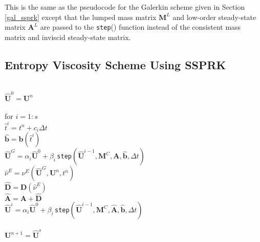 This is the same as the pseudocode for the Galerkin scheme
given in Section \ref{gal_ssprk} except that the lumped
mass matrix $\mathbf{M}^L$ and low-order steady-state
matrix $\mathbf{A}^L$ are passed to the \texttt{step}()
function instead of the consistent mass matrix and
inviscid steady-state matrix.
\subsection{Entropy Viscosity Scheme Using SSPRK}

{\noindent\\
$\hat{\mathbf{U}}^0 = \mathbf{U}^n$\\
\\
for $i=1:s$\\
\tab $\hat{t}^i = t^n+c_i\Delta t$\\
\tab $\hat{\mathbf{b}} = \mathbf{b}(\hat{t}^i)$\\
\tab $\hat{\mathbf{U}}^G = \alpha_i\hat{\mathbf{U}}^0
   + \beta_i\,$\texttt{step}$(\hat{\mathbf{U}}^{i-1},\mathbf{M}^C,
   \mathbf{A},\hat{\mathbf{b}},\Delta t)$\\
\tab $\hat{\nu}^E = \nu^E(\hat{\mathbf{U}}^G,\mathbf{U}^n,t^n)$\\
\tab $\hat{\mathbf{D}} = \mathbf{D}(\hat{\nu}^E)$\\
\tab $\hat{\mathbf{A}} = \mathbf{A} + \hat{\mathbf{D}}$\\
\tab $\hat{\mathbf{U}}^i = \alpha_i\hat{\mathbf{U}}^0
   + \beta_i\,$\texttt{step}$(\hat{\mathbf{U}}^{i-1},\mathbf{M}^C,
   \hat{\mathbf{A}},\hat{\mathbf{b}},\Delta t)$\\
\\
$\mathbf{U}^{n+1} = \hat{\mathbf{U}}^s$\\
}

